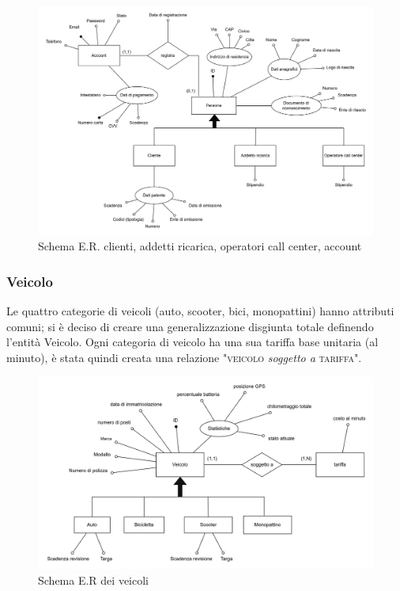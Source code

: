 \documentclass{article}
\begin{document}
\begin{figure}[H]
    \centering
    \includegraphics[width=1\linewidth]{bottom-up-persona.png}
    \caption{Schema E.R. clienti, addetti ricarica, operatori call center, account}
    \label{fig:bottom-up-persona}
\end{figure}

\subsubsection{Veicolo}

Le quattro categorie di veicoli (auto, scooter, bici, monopattini) hanno attributi comuni; si è deciso di creare una generalizzazione disgiunta totale definendo l'entità Veicolo. Ogni categoria di veicolo ha una sua tariffa base unitaria (al minuto), è stata quindi creata una relazione "\textsc{veicolo} \textit{soggetto a} \textsc{tariffa}".

\begin{figure}[H]
    \centering
    \includegraphics[width=1\linewidth]{bottom-up-veicolo.png}
    \caption{Schema E.R dei veicoli}
    \label{fig:bottom-up-veicolo}
\end{figure}
\end{document}

